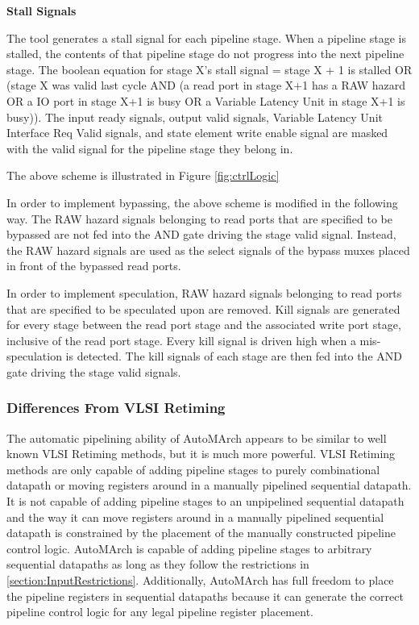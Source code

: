 {\bf Stall Signals}

The tool generates a stall signal for each pipeline stage. When a pipeline stage is stalled, the contents of that pipeline stage do not progress into the next pipeline stage. The boolean equation for stage X's stall signal = stage X + 1 is stalled OR (stage X was valid last cycle AND (a read port in stage X+1 has a RAW hazard OR a IO port in stage X+1 is busy OR a Variable Latency Unit in stage X+1 is busy)). The input ready signals, output valid signals, Variable Latency Unit Interface Req Valid signals, and state element write enable signal are masked with the valid signal for the pipeline stage they belong in. 

The above scheme is illustrated in Figure \ref{fig:ctrlLogic}

In order to implement bypassing, the above scheme is modified in the following way. The RAW hazard signals belonging to read ports that are specified to be bypassed are not fed into the AND gate driving the stage valid signal. Instead, the RAW hazard signals are used as the select signals of the bypass muxes placed in front of the bypassed read ports.

In order to implement speculation, RAW hazard signals belonging to read ports that are specified to be speculated upon are removed. Kill signals are generated for every stage between the read port stage and the associated write port stage, inclusive of the read port stage. Every kill signal is driven high when a mis-speculation is detected. The kill signals of each stage are then fed into the AND gate driving the stage valid signals.

\subsubsection{Differences From VLSI Retiming}
The automatic pipelining ability of AutoMArch appears to be similar to well known VLSI Retiming methods, but it is much more powerful. VLSI Retiming methods are only capable of adding pipeline stages to purely combinational datapath or moving registers around in a manually pipelined sequential datapath. It is not capable of adding pipeline stages to an unpipelined sequential datapath and the way it can move registers around in a manually pipelined sequential datapath is constrained by the placement of the manually constructed pipeline control logic. AutoMArch is capable of adding pipeline stages to arbitrary sequential datapaths as long as they follow the restrictions in \ref{section:InputRestrictions}. Additionally, AutoMArch has full freedom to place the pipeline registers in sequential datapaths because it can generate the correct pipeline control logic for any legal pipeline register placement.

